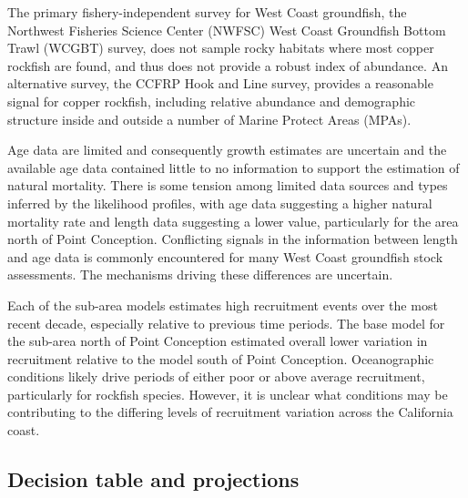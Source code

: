 \documentclass[11pt,
  english,
  letterpaper,
]{article}
\begin{document}
The primary fishery-independent survey for West Coast groundfish, the Northwest Fisheries Science Center (NWFSC) West Coast Groundfish Bottom Trawl (WCGBT) survey, does not sample rocky habitats where most copper rockfish are found, and thus does not provide a robust index of abundance. An alternative survey, the CCFRP Hook and Line survey, provides a reasonable signal for copper rockfish, including relative abundance and demographic structure inside and outside a number of Marine Protect Areas (MPAs).

Age data are limited and consequently growth estimates are uncertain and the available age data contained little to no information to support the estimation of natural mortality. There is some tension among limited data sources and types inferred by the likelihood profiles, with age data suggesting a higher natural mortality rate and length data suggesting a lower value, particularly for the area north of Point Conception. Conflicting signals in the information between length and age data is commonly encountered for many West Coast groundfish stock assessments. The mechanisms driving these differences are uncertain.

Each of the sub-area models estimates high recruitment events over the most recent decade, especially relative to previous time periods. The base model for the sub-area north of Point Conception estimated overall lower variation in recruitment relative to the model south of Point Conception. Oceanographic conditions likely drive periods of either poor or above average recruitment, particularly for rockfish species. However, it is unclear what conditions may be contributing to the differing levels of recruitment variation across the California coast.

\hypertarget{decision-table-and-projections}{%
\subsection*{Decision table and projections}\label{decision-table-and-projections}}
\end{document}
